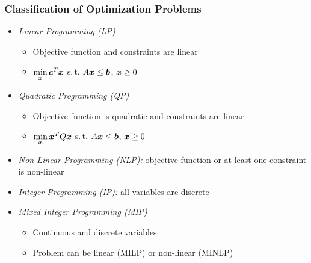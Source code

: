 \documentclass[%
  final,
  11pt, 
  show notes, %
  t, %
  fleqn, %
]{beamer}
\begin{document}
\begin{frame}[fragile]
  \frametitle{Classification of Optimization Problems}
\begin{itemize}
\item \emph{Linear Programming (LP)} 
\begin{itemize}
\item Objective function and constraints are linear
\item $\min\limits_{\bm{x}} \bm{c}^T \bm{x}$ s.\,t. $A \bm{x} \leq \bm{b}$, $\bm{x} \geq 0$
\end{itemize}
\item \emph{Quadratic Programming (QP)} 
\begin{itemize}
\item Objective function is quadratic and constraints are linear
\item $\min\limits_{\bm{x}} \bm{x}^T Q \bm{x}$ s.\,t. $A \bm{x} \leq \bm{b}$, $\bm{x} \geq 0$
\end{itemize}
\vspace*{0.4cm}
\item \emph{Non-Linear Programming (NLP):} objective function or at least one constraint is non-linear
\vspace*{0.4cm}
\item \emph{Integer Programming (IP):} all variables are discrete
\item \emph{Mixed Integer Programming (MIP)} 
\begin{itemize}
\item Continuous and discrete variables
\item Problem can be linear (MILP) or non-linear (MINLP)
\end{itemize}
\end{itemize}
\end{frame}
\end{document}
